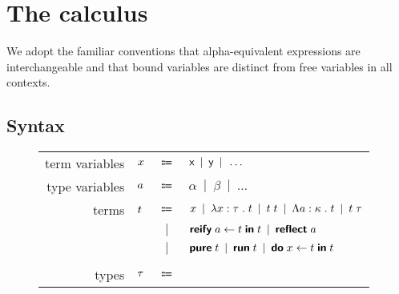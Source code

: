 \section{The calculus}

  We adopt the familiar conventions that alpha-equivalent expressions are interchangeable and that bound variables are distinct from free variables in all contexts.

  \subsection{Syntax}

    \begin{figure}[H]
      \begin{center}
        \begin{tabular}{r l c l}
          term variables & \(x\) & \(\Coloneqq\) & \(
            \textsf{x}                                             \enspace | \enspace
            \textsf{y}                                             \enspace | \enspace
            \ldots                                          \) \\
          type variables & \(a\) & \(\Coloneqq\) & \(
            \alpha                                          \enspace | \enspace
            \beta                                           \enspace | \enspace
            \ldots                                          \) \\
          terms & \(t\) & \(\Coloneqq\) & \(
            x                                           \enspace | \enspace
            \lambda x : \tau \; . \; t                      \enspace | \enspace
            t \; t                             \enspace | \enspace
            \Lambda a : \kappa \; . \; t                     \enspace | \enspace
            t \; \tau                            \) \\
          & & \(|\) & \(
            \textsf{\textbf{reify}} \; a \leftarrow t \; \textsf{\textbf{in}} \; t                    \enspace | \enspace
            \textsf{\textbf{reflect}} \; a                                \) \\
          & & \(|\) & \(
            \textsf{\textbf{pure}} \; t                                   \enspace | \enspace
            \textsf{\textbf{run}} \; t                                    \enspace | \enspace
            \textsf{\textbf{do}} \; x \leftarrow t \; \textsf{\textbf{in}} \; t                       \) \\ \\
          types & \(\tau\) & \(\Coloneqq\) & \(
            \tVar                                           \enspace | \enspace

\end{tabular}
\end{center}
\end{figure}
